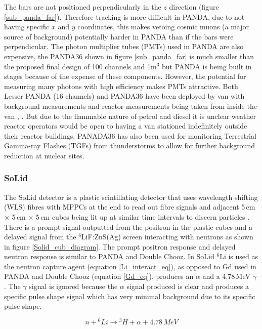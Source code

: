 \documentclass[12pt,a4paper]{article}
\begin{document}
The bars are not positioned perpendicularly in the $z$ direction (figure \ref{sub_panda_far}). Therefore tracking is more difficult in PANDA, due to not having specific $x$ and $y$ coordinates, this makes vetoing cosmic muons (a major source of background) potentially harder in PANDA than if the bars were perpendicular. The photon multiplier tubes (PMTs) used in PANDA are also expensive, the PANDA36 shown in figure \ref{sub_panda_far} is much smaller than the proposed final design of 100 channels and 1m$^3$ \cite{PANDA_2012} but PANDA is being built in stages because of the expense of these components. However, the potential for measuring many photons with high efficiency makes PMTs attractive. Both Lesser PANDA (16 channels) and PANDA36 have been deployed by van with background measurements and reactor measurements being taken from inside the van \cite{PANDA_2012}, \cite{PANDA_2014}. But due to the flammable nature of petrol and diesel it is unclear weather reactor operators would be open to having a van stationed indefinitely outside their reactor buildings. PANADA36 has also been used for monitoring Terrestrial Gamma-ray Flashes (TGFs) from thunderstorms to allow for further background reduction at nuclear sites\cite{PANDA_tgf}. 

\subsubsection{SoLid}
The SoLid detector is a plastic scintillating detector that uses wavelength shifting (WLS) fibres with MPPCs at the end to read out fibre signals and adjacent 5\,cm $\times$ 5\,cm $\times$ 5\,cm cubes being lit up at similar time intervals to discern particles \cite{Solid_proposal}. There is a prompt signal outputted from the positron in the plastic cubes and a delayed signal from the $^6$LiF:ZnS(Ag) screen interacting with neutrons as shown in figure \ref{Solid_cub_diagram}. The prompt positron response and delayed neutron response is similar to PANDA and Double Chooz. In SoLid $^6$Li is used as the neutron capture agent (equation \ref{Li_interact_eq}), as opposed to Gd used in PANDA and Double Chooz (equation \ref{Gd_eq}), produces an $\alpha$ and a 4.78\,MeV $\gamma$ \cite{Solid_readout}. The $\gamma$ signal is ignored because the $\alpha$ signal produced is clear and produces a specific pulse shape signal \cite{Solid_readout} which has very minimal background due to its specific pulse shape. 

\begin{equation}
n + {^6Li} \rightarrow {^3H} + \alpha +4.78\,MeV
\label{Li_interact_eq}
\end{equation}
\end{document}
